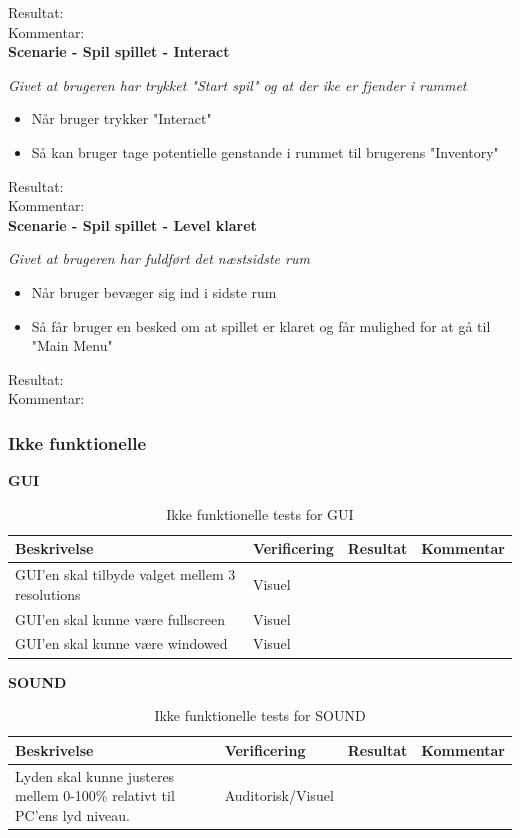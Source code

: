 Resultat:\\
Kommentar:\\

\textbf{Scenarie - Spil spillet - Interact}

\textit{Givet at brugeren har trykket "Start spil" og at der ike er fjender i rummet}

\begin{itemize}
  \item Når bruger trykker "Interact"
  \item Så kan bruger tage potentielle genstande i rummet til brugerens "Inventory"
\end{itemize}

Resultat:\\
Kommentar:\\

\textbf{Scenarie - Spil spillet - Level klaret}

\textit{Givet at brugeren har fuldført det næstsidste rum}

\begin{itemize}
  \item Når bruger bevæger sig ind i sidste rum
  \item Så får bruger en besked om at spillet er klaret og får mulighed for at gå til "Main Menu"
\end{itemize}

Resultat:\\
Kommentar:\\

\subsubsection{Ikke funktionelle}
\textbf{GUI}\\
\begin{table}[H]
\caption{ Ikke funktionelle tests for GUI}
\label{tab:}
\begin{tabular}{|p{3cm}|p{3cm}|p{3cm}|p{3cm}|}
\hline
Beskrivelse & Verificering & Resultat & Kommentar \\
\hline
GUI'en skal tilbyde valget mellem 3 resolutions & Visuel & & \\
\hline
GUI'en skal kunne være fullscreen & Visuel & &\\
\hline
GUI'en skal kunne være windowed & Visuel & & \\
\hline
\end{tabular}
\end{table}

\textbf{SOUND}\\
\begin{table}[H]
\caption{ Ikke funktionelle tests for SOUND}
\label{tab:}
\begin{tabular}{|p{3cm}|p{3cm}|p{3cm}|p{3cm}|	}
\hline
Beskrivelse & Verificering & Resultat & Kommentar \\
\hline
Lyden skal kunne justeres mellem 0-100\% relativt til PC'ens lyd niveau. & Auditorisk/Visuel & & \\
\hline
\end{tabular}
\end{table}

